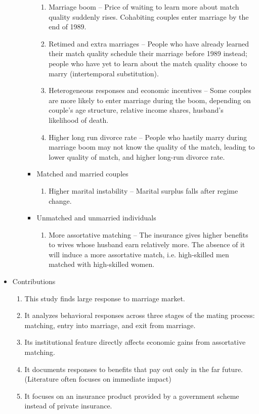 \documentclass[a4paper, 12pt]{article}
\begin{document}
\begin{itemize}
\begin{itemize}
\begin{itemize}
\begin{enumerate}
\item Marriage boom -- Price of waiting to learn more about match quality suddenly rises. Cohabiting couples enter marriage by the end of 1989.
\item Retimed and extra marriages -- People who have already learned their match quality schedule their marriage before 1989 instead; people who have yet to learn about the match quality choose to marry (intertemporal substitution).
\item Heterogeneous responses and economic incentives -- Some couples are more likely to enter marriage during the boom, depending on couple's age structure, relative income shares, husband's likelihood of death.
\item Higher long run divorce rate -- People who hastily marry during marriage boom may not know the quality of the match, leading to lower quality of match, and higher long-run divorce rate.
\end{enumerate}
\item Matched and married couples
\begin{enumerate}
\item Higher marital instability -- Marital surplus falls after regime change.
\end{enumerate}
\item Unmatched and unmarried individuals
\begin{enumerate}
\item More assortative matching -- The insurance gives higher benefits to wives whose husband earn relatively more. The absence of it will induce a more assortative match, i.e. high-skilled men matched with high-skilled women.
\end{enumerate}
\end{itemize}
\end{itemize}
\item Contributions
\begin{enumerate}
\item This study finds large response to marriage market.
\item It analyzes behavioral responses across three stages of the mating process: matching, entry into marriage, and exit from marriage.
\item Its institutional feature directly affects economic gains from assortative matching.
\item It documents responses to benefits that pay out only in the far future. (Literature often focuses on immediate impact)
\item It focuses on an insurance product provided by a government scheme instead of private insurance.
\end{enumerate}
\end{itemize}
\end{document}

